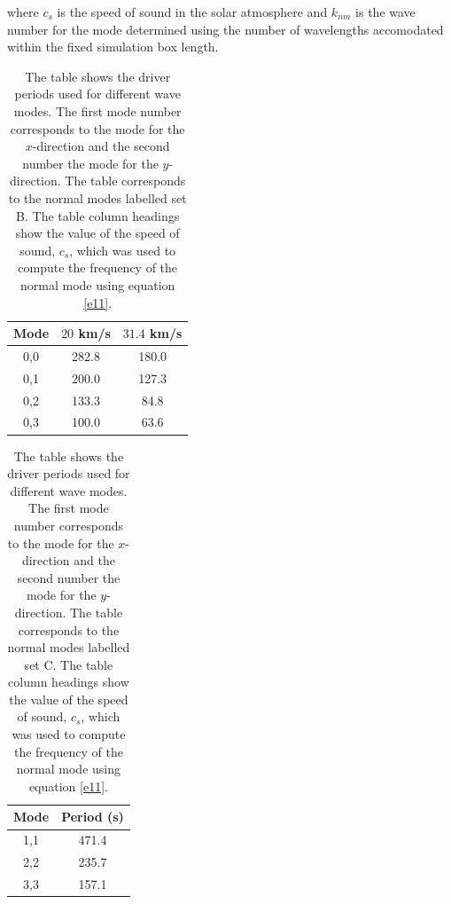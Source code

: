 \documentclass[preprint,authoryear,12pt]{elsarticle}
\begin{document}
where $c_{s}$ is the speed of sound in the solar atmosphere and $k_{nm}$ is the wave number for the mode determined using the number of wavelengths accomodated within the fixed simulation box length.
\begin{table}
\centering
\begin{tabular}{c c c }
\hline
Mode &  $20$ km/s &  $
31.4$ km/s \\
\hline
0,0  & 282.8 & 180.0 \\
\hline
0,1  & 200.0 & 127.3  \\
\hline
0,2  & 133.3 & 84.8  \\
\hline
0,3  & 100.0 & 63.6  \\
\hline
\end{tabular} 
\caption{The table shows the driver periods used for different wave modes. The first mode number corresponds to the mode for the $x$-direction and the second number the mode for the $y$-direction. The table corresponds to the normal modes labelled set B. The table column headings show the value of the speed of sound, $c_s$, which was used to compute the frequency of the normal mode using equation \ref{e11}. }
\label{Table2}
\end{table}

\begin{table}\label{simcperiods}
\centering
\begin{tabular}{c c }
\hline
Mode   &  Period (s) \\
\hline
1,1 & 471.4  \\
\hline
2,2 & 235.7   \\
\hline
3,3 & 157.1   \\
\hline

\end{tabular} 
\caption{The table shows the driver periods used for different wave modes. The first mode number corresponds to the mode for the $x$-direction and the second number the mode for the $y$-direction. The table corresponds to the normal modes labelled set C. The table column headings show the value of the speed of sound, $c_s$, which was used to compute the frequency of the normal mode using equation \ref{e11}.}
\label{Tableamps_equalmodenumber}
\end{table}
\end{document}
